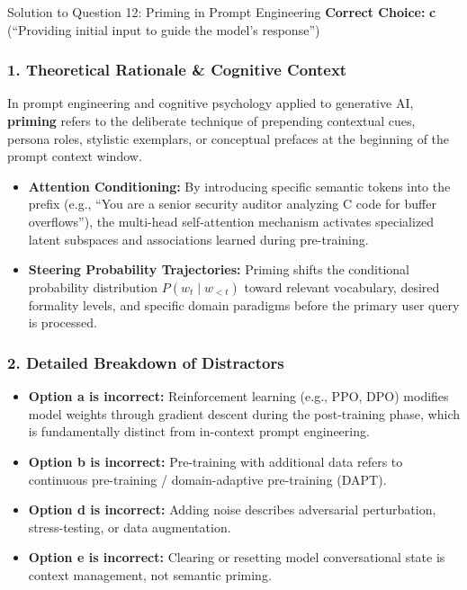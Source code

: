 \documentclass[11pt,a4paper]{article}
\begin{document}
\begin{solutionbox}{Solution to Question 12: Priming in Prompt Engineering}
\textbf{Correct Choice:} \textbf{c} (``Providing initial input to guide the model's response'')

\subsubsection*{1. Theoretical Rationale \& Cognitive Context}
In prompt engineering and cognitive psychology applied to generative AI, \textbf{priming} refers to the deliberate technique of prepending contextual cues, persona roles, stylistic exemplars, or conceptual prefaces at the beginning of the prompt context window.
\begin{itemize}[leftmargin=1.5em]
    \item \textbf{Attention Conditioning:} By introducing specific semantic tokens into the prefix (e.g., ``You are a senior security auditor analyzing C code for buffer overflows''), the multi-head self-attention mechanism activates specialized latent subspaces and associations learned during pre-training.
    \item \textbf{Steering Probability Trajectories:} Priming shifts the conditional probability distribution $P(w_t \mid w_{<t})$ toward relevant vocabulary, desired formality levels, and specific domain paradigms before the primary user query is processed.
\end{itemize}

\subsubsection*{2. Detailed Breakdown of Distractors}
\begin{itemize}[leftmargin=1.5em]
    \item \textbf{Option a is incorrect:} Reinforcement learning (e.g., PPO, DPO) modifies model weights through gradient descent during the post-training phase, which is fundamentally distinct from in-context prompt engineering.
    \item \textbf{Option b is incorrect:} Pre-training with additional data refers to continuous pre-training / domain-adaptive pre-training (DAPT).
    \item \textbf{Option d is incorrect:} Adding noise describes adversarial perturbation, stress-testing, or data augmentation.
    \item \textbf{Option e is incorrect:} Clearing or resetting model conversational state is context management, not semantic priming.
\end{itemize}
\end{solutionbox}
\end{document}
